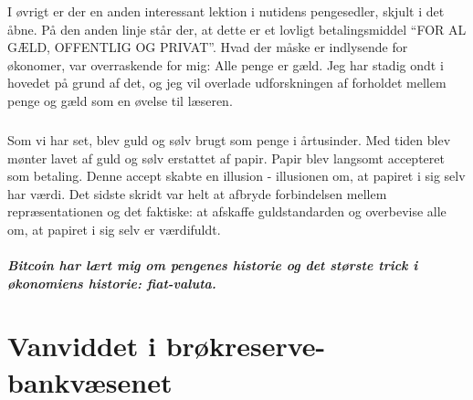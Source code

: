 \documentclass[paper=6in:9in,pagesize=pdftex,headinclude=on,footinclude=on,12pt]{scrbook}
\begin{document}
I øvrigt er der en anden interessant lektion i nutidens pengesedler, skjult i det åbne. På den anden linje står der, at dette er et lovligt betalingsmiddel \enquote{FOR AL GÆLD, OFFENTLIG OG PRIVAT}. Hvad der måske er indlysende for økonomer, var overraskende for mig: Alle penge er gæld. Jeg har stadig ondt i hovedet på grund af det, og jeg vil overlade udforskningen af forholdet mellem penge og gæld som en øvelse til læseren.\paragraph{} Som vi har set, blev guld og sølv brugt som penge i årtusinder. Med tiden blev mønter lavet af guld og sølv erstattet af papir. Papir blev langsomt accepteret som betaling. Denne accept skabte en illusion - illusionen om, at papiret i sig selv har værdi. Det sidste skridt var helt at afbryde forbindelsen mellem repræsentationen og det faktiske: at afskaffe guldstandarden og overbevise alle om, at papiret i sig selv er værdifuldt.\paragraph{Bitcoin har lært mig om pengenes historie og det største trick i økonomiens historie: fiat-valuta.}%
%
%
%
%

\chapter{Vanviddet i brøkreserve-bankvæsenet}
\label{les:13}
\end{document}
